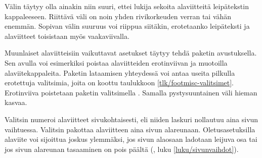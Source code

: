 \begin{koodilohkosis}
\geometry{footnotesep=14bp}
\end{koodilohkosis}

\noindent
Välin täytyy olla ainakin niin suuri, ettei lukija sekoita alaviitteitä
leipätekstin kappaleeseen. Riittävä väli on noin yhden rivikorkeuden
verran tai vähän enemmän. Sopivan välin suuruus voi riippua siitäkin,
erotetaanko leipäteksti ja alaviitteet toisistaan myös vaakaviivalla.

Muunlaiset alaviitteisiin vaikuttavat asetukset täytyy tehdä paketin
 avustuksella. Sen avulla voi esimerkiksi poistaa
alaviitteiden erotinviivan ja muotoilla alaviitekappaleita. Paketin
lataamisen yhteydessä voi antaa useita pilkulla erotettuja valitsimia,
joita on koottu taulukkoon \ref{tlk/footmisc-valitsimet}. Erotinviiva
poistetaan paketin valitsimella . Samalla pystysuuntainen
väli hieman kasvaa.


\begin{koodilohkosis}
\usepackage[norule]{footmisc}
\end{koodilohkosis}

\noindent
Valitsin  numeroi alaviitteet sivukohtaisesti, eli niiden
laskuri nollautuu aina sivun vaihtuessa. Valitsin 
pakottaa alaviitteen aina sivun alareunaan. Oletusasetuksilla alaviite
voi sijoittua joskus ylemmäksi, jos sivun alaosaan ladotaan leijuva osa
tai jos sivun alareunan tasaaminen on pois päältä
(, luku \ref{luku/sivunvaihdot}).


